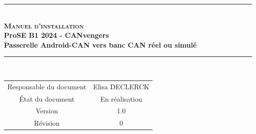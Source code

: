 \documentclass[a4paper,11pt,titlepage,french]{article}
\newcommand{\version}{1.0}
\newcommand{\revision}{0}
\newcommand{\documentName}{Manuel d'installation}
\newcommand{\prose}{ProSE}
\newcommand{\creator}{Elisa DECLERCK}
\newcommand{\projectName}{Passerelle Android-CAN vers banc CAN réel ou simulé} %
\newcommand{\annee}{2024}
\newcommand{\teamName}{CANvengers}
\newcommand{\teamNumber}{B1}
\begin{document}
\makeatother
\begin{center} %
    \vspace*{2cm} %
    \rule[0.5ex]{0.7\textwidth}{0.1mm}\\ %
    \vspace*{2mm} %
        {\Huge {\textsc{\bf {\documentName}}}} %
    \vspace{0.4cm}\\ %
        {\large\bf {\prose} {\teamNumber} {\annee} - {\teamName}}\\ %
    \vspace*{1mm}
        {\large\bf {\projectName}}\\ %
    \rule[0.5ex]{0.75\textwidth}{0.1mm}\\ %
    \vspace{2cm} 
    \begin{tabular}{|c|c|} %
        \hline %
            Responsable du document & {\creator}                      \\
            État du document        & En réalisation                  \\
            Version                 & {\version}                      \\
            Révision                & {\revision}                     \\
        \hline
    \end{tabular}
\end{center}
\vspace{3cm} 

 

\end{document}
